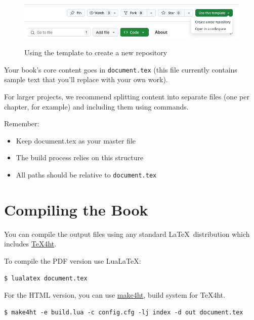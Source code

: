 \documentclass{book}
\begin{document}
\begin{figure}[htbp]
  \includegraphics[width=\textwidth,alt={Image of button for use of this repository as a template}]{img/template-use.png}
\caption{Using the template to create a new repository}
\label{fig:template}
\end{figure}

Your book's core content goes in \texttt{document.tex} (this file currently contains
sample text that you'll replace with your own work).

For larger projects, we recommend splitting content into separate files (one
per chapter, for example) and including them using \verb|| commands.

Remember:

\begin{itemize}
  \item Keep document.tex as your master file

  \item The build process relies on this structure

  \item All \verb|| paths should be relative to \texttt{document.tex}
\end{itemize}


\chapter{Compiling the Book}


You can compile the output files using any standard \LaTeX\ distribution which includes \href{https://www.tug.org/tex4ht/}{\TeX4ht}.

To compile the PDF version use Lua\LaTeX:

\begin{verbatim}
$ lualatex document.tex
\end{verbatim}

For the HTML version, you can use \href{https://github.com/michal-h21/make4ht}{make4ht}, build system for \TeX4ht.

\begin{verbatim}
$ make4ht -e build.lua -c config.cfg -lj index -d out document.tex
\end{verbatim}
\end{document}
